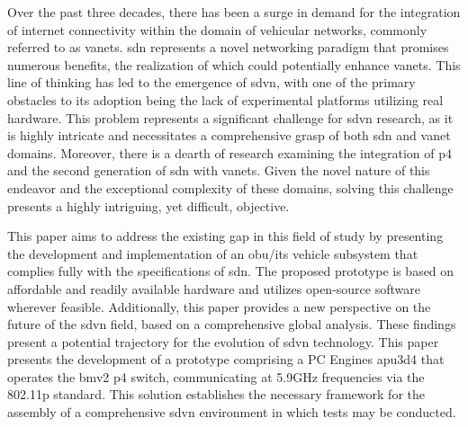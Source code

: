 
%





Over the past three decades, there has been a surge in demand for the integration of internet connectivity within the domain of vehicular networks, commonly referred to as \glspl{vanet}. \gls{sdn} represents a novel networking paradigm that promises numerous benefits, the realization of which could potentially enhance \glspl{vanet}. This line of thinking has led to the emergence of \gls{sdvn}, with one of the primary obstacles to its adoption being the lack of experimental platforms utilizing real hardware. This problem represents a significant challenge for \gls{sdvn} research, as it is highly intricate and necessitates a comprehensive grasp of both \gls{sdn} and \gls{vanet} domains. Moreover, there is a dearth of research examining the integration of \gls{p4} and the second generation of \gls{sdn} with \glspl{vanet}. Given the novel nature of this endeavor and the exceptional complexity of these domains, solving this challenge presents a highly intriguing, yet difficult, objective.

This paper aims to address the existing gap in this field of study by presenting the development and implementation of an \gls{obu}/\gls{its} vehicle subsystem that complies fully with the specifications of \gls{sdn}. The proposed prototype is based on affordable and readily available hardware and utilizes open-source software wherever feasible. Additionally, this paper provides a new perspective on the future of the \gls{sdvn} field, based on a comprehensive global analysis. These findings present a potential trajectory for the evolution of \gls{sdvn} technology. This paper presents the development of a prototype comprising a PC Engines apu3d4 that operates the \gls{bmv2} \gls{p4} switch, communicating at 5.9GHz frequencies via the 802.11p standard. This solution establishes the necessary framework for the assembly of a comprehensive \gls{sdvn} environment in which tests may be conducted. 






